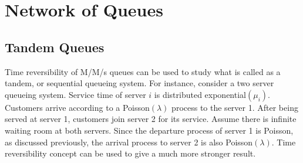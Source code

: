 \documentclass[a4paper,10pt,english]{article}
\begin{document}
\section{Network of Queues}
\subsection{Tandem Queues}
Time reversibility of M/M/s queues can be used to study what is called as a tandem, or sequential queueing system. For instance, consider a two server queueing system. Service time of server $i$ is distributed exponential$(\mu_i)$. Customers arrive according to a Poisson$(\lambda)$ process to the server 1. After being served at server 1, customers join server  2 for its service. Assume there is infinite waiting room at both servers. Since the departure process of server 1 is Poisson, as discussed previously, the arrival process to server 2 is also Poisson$(\lambda)$. Time reversibility concept can be used to give a much more stronger result.
\end{document}
